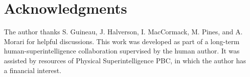 


















\clearpage
\label{atlaspart:end}



\clearpage
\section*{Acknowledgments}\label{app:acknowledgments}
The author thanks S. Guineau, J. Halverson, I. MacCormack, M. Pines, and A. Morari for helpful discussions. This work was developed as part of a long-term human-superintelligence collaboration supervised by the human author. It was assisted by resources of Physical Superintelligence PBC, in which the author has a financial interest.


